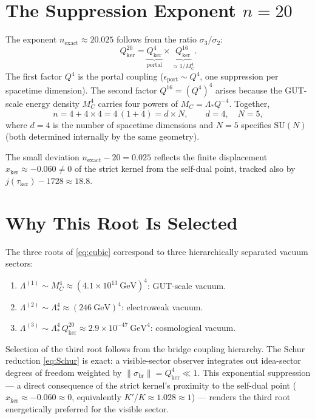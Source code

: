 \documentclass[12pt]{article}
\begin{document}
\section{The Suppression Exponent $n=20$}

The exponent $n_{\mathrm{exact}}\approx20.025$ follows from
the ratio $\sigma_3/\sigma_2$:
\begin{equation}
Q_{\mathrm{ker}}^{20}
=\underbrace{Q_{\mathrm{ker}}^4}_{\text{portal}}
\times\underbrace{Q_{\mathrm{ker}}^{16}}_{\approx1/M_C^4}.
\end{equation}
The first factor $Q^4$ is the portal coupling
($\epsilon_{\mathrm{port}}\sim Q^4$, one suppression per spacetime dimension).
The second factor $Q^{16}=(Q^4)^4$ arises because the GUT-scale
energy density $M_C^4$ carries four powers of
$M_C=\Lambda_*Q^{-4}$.
Together,
\begin{equation}
n=4+4\times4=4\,(1+4)=d\times N,\qquad d=4,\quad N=5,
\label{eq:n}
\end{equation}
where $d=4$ is the number of spacetime dimensions
and $N=5$ specifies $\mathrm{SU}(N)$
(both determined internally by the same geometry).

The small deviation $n_{\mathrm{exact}}-20=0.025$ reflects
the finite displacement $x_{\mathrm{ker}}\approx-0.060\neq0$
of the strict kernel from the self-dual point,
tracked also by $j(\tau_{\mathrm{ker}})-1728\approx18.8$.

\section{Why This Root Is Selected}

The three roots of \eqref{eq:cubic} correspond to three
hierarchically separated vacuum sectors:
\begin{enumerate}[label=(\roman*)]
\item $\Lambda^{(1)}\sim M_C^4\approx(4.1\times10^{13}~\mathrm{GeV})^4$:
      GUT-scale vacuum.
\item $\Lambda^{(2)}\sim\Lambda_*^4\approx(246~\mathrm{GeV})^4$:
      electroweak vacuum.
\item $\Lambda^{(3)}\sim\Lambda_*^4\,Q_{\mathrm{ker}}^{20}
      \approx2.9\times10^{-47}~\mathrm{GeV}^4$:
      cosmological vacuum.
\end{enumerate}

Selection of the third root follows from the bridge coupling hierarchy.
The Schur reduction \eqref{eq:Schur} is exact:
a visible-sector observer integrates out idea-sector degrees of freedom
weighted by $\|\sigma_{\mathrm{br}}\|=Q_{\mathrm{ker}}^4\ll1$.
This exponential suppression --- a direct consequence of the strict
kernel's proximity to the self-dual point
($x_{\mathrm{ker}}\approx-0.060\approx0$, equivalently $K'/K\approx1.028\approx1$)
--- renders the third root energetically preferred for the visible sector.
\end{document}
